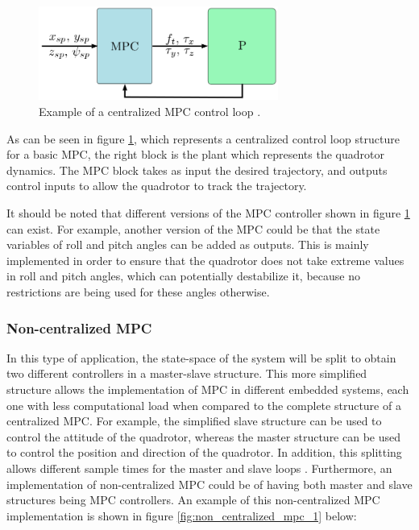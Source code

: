 \documentclass{thesisreport}
\begin{document}
\begin{figure}[h]
	\centering
	\includegraphics[width=0.7\textwidth]{Images/Control/MPC/centralized_mpc.png}
	\caption{Example of a centralized MPC control loop \cite{Alvarez-Valle2019}.}
	\label{fig:centralized_mpc}
\end{figure}

As can be seen in figure \ref{fig:centralized_mpc}, which represents a centralized control loop structure for a basic MPC, the right block is the plant which represents the quadrotor dynamics. The MPC block takes as input the desired trajectory, and outputs control inputs to allow the quadrotor to track the trajectory.

It should be noted that different versions of the MPC controller shown in figure \ref{fig:centralized_mpc} can exist. For example, another version of the MPC could be that the state variables of roll and pitch angles can be added as outputs. This is mainly implemented in order to ensure that the quadrotor does not take extreme values in roll and pitch angles, which can potentially destabilize it, because no restrictions are being used for these angles otherwise.

\subsubsection{Non-centralized MPC} 

In this type of application, the state-space of the system will be split to obtain two different controllers in a master-slave structure. This more simplified structure allows the implementation of MPC in different embedded systems, each one with less computational load when compared to the complete structure of a centralized MPC. For example, the simplified slave structure can be used to control the attitude of the quadrotor, whereas the master structure can be used to control the position and direction of the quadrotor. In addition, this splitting allows different sample times for the master and slave loops \cite{Bingfang2004}. Furthermore, an implementation of non-centralized MPC could be of having both master and slave structures being MPC controllers. An example of this non-centralized MPC implementation is shown in figure \ref{fig:non_centralized_mpc_1} below:
\end{document}
